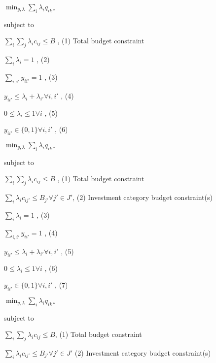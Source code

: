 \documentclass[letterpaper,10pt,english]{sphinxmanual}
\begin{document}
\sphinxAtStartPar
{}

\sphinxAtStartPar
\(\min_{y, \lambda} \sum_i \lambda_{i}q_{ik*}\)

\sphinxAtStartPar
subject to

\sphinxAtStartPar
\(\sum_i \sum_j \lambda_{i}c_{ij} \leq B\) , (1) Total budget constraint

\sphinxAtStartPar
\(\sum_i \lambda_i = 1\) , (2)

\sphinxAtStartPar
\(\sum_{i,i'} y_{ii'} = 1\) , (3)

\sphinxAtStartPar
\(y_{ii'} \leq \lambda_i + \lambda_{i'} \forall i, i'\) , (4)

\sphinxAtStartPar
\(0 \leq \lambda_i \leq 1 \forall i\) , (5)

\sphinxAtStartPar
\(y_{ii'} \in \{ 0, 1 \} \forall i, i'\) , (6)

\sphinxAtStartPar
{}

\sphinxAtStartPar
\(\min_{y, \lambda} \sum_i \lambda_{i}q_{ik*}\)

\sphinxAtStartPar
subject to

\sphinxAtStartPar
\(\sum_i \sum_j \lambda_{i}c_{ij} \leq B\) , (1) Total budget constraint

\sphinxAtStartPar
\(\sum_i \lambda_{i}c_{ij'} \leq B_{j'} \forall j' \in J'\),   (2) Investment category budget constraint(s)

\sphinxAtStartPar
\(\sum_i \lambda_i = 1\) , (3)

\sphinxAtStartPar
\(\sum_{i,i'} y_{ii'} = 1\) , (4)

\sphinxAtStartPar
\(y_{ii'} \leq \lambda_i + \lambda_{i'} \forall i, i'\) , (5)

\sphinxAtStartPar
\(0 \leq \lambda_i \leq 1 \forall i\) , (6)

\sphinxAtStartPar
\(y_{ii'} \in \{ 0, 1 \} \forall i, i'\) , (7)

\sphinxAtStartPar
{}

\sphinxAtStartPar
\(\min_{y, \lambda} \sum_i \lambda_{i}q_{ik*}\)

\sphinxAtStartPar
subject to

\sphinxAtStartPar
\(\sum_i \sum_j \lambda_{i}c_{ij} \leq B\), (1) Total budget constraint

\sphinxAtStartPar
\(\sum_i \lambda_{i}c_{ij'} \leq B_{j'} \forall j' \in J'\)   (2) Investment category budget constraint(s)
\end{document}
